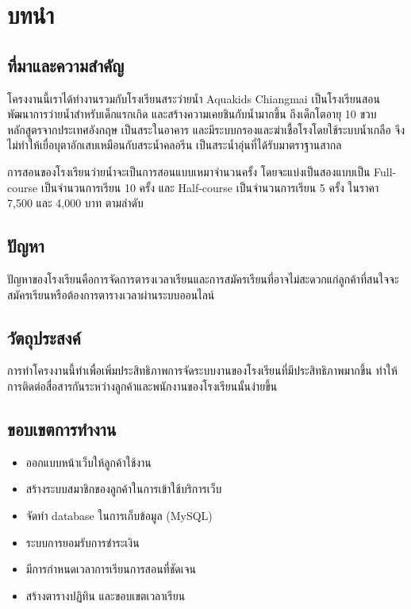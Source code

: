 \section{บทนำ}

\subsection{ที่มาและความสำคัญ}

โครงงานนี้เราได้ทำงานรวมกับโรงเรียนสระว่ายน้ำ Aquakids Chiangmai เป็นโรงเรียนสอนพัฒนาการว่ายน้ำสำหรับเด็กแรกเกิด และสร้างความเคยชินกับน้ำมากขึ้น ถึงเด็กโตอายุ 10 ขวบ หลักสูตรจากประเทศอังกฤษ เป็นสระในอาคาร และมีระบบกรองและฆ่าเชื้อโรงโดยใช้ระบบน้ำเกลือ จึงไม่ทำให้เยื่อบุตาอักเสบเหมือนกับสระน้ำคลอรีน เป็นสระน้ำอุ่นที่ได้รับมาตราฐานสากล

การสอนของโรงเรียนว่ายน้ำจะเป็นการสอนแบบเหมาจำนวนครั้ง โดยจะแบ่งเป็นสองแบบเป็น Full-course เป็นจำนวนการเรียน 10 ครั้ง และ Half-course เป็นจำนวนการเรียน 5 ครั้ง ในราคา 7,500 และ 4,000 บาท ตามลำดับ

\subsection{ปัญหา}

ปัญหาของโรงเรียนคือการจัดการตารงเวลาเรียนและการสมัครเรียนที่อาจไม่สะดวกแก่ลูกค้าที่สนใจจะสมัครเรียนหรือต้องการตารางเวลาผ่านระบบออนไลน์

\subsection{วัตถุประสงค์}

การทำโครงงานนี้ทำเพื่อเพิ่มประสิทธิภาพการจัดระบบงานของโรงเรียนที่มีประสิทธิภาพมากขึ้น ทำให้การติดต่อสื่อสารกันระหว่างลูกค้าและพนักงานของโรงเรียนนั้นง่ายขึ้น

\subsection{ขอบเขตการทำงาน}

\begin{itemize}
    \item ออกแบบหน้าเว็บให้ลูกค้าใช้งาน
    \item สร้างระบบสมาชิกของลูกค้าในการเข้าใช้บริการเว็บ
    \item จัดทำ database ในการเก็บข้อมูล (MySQL)
    \item ระบบการยอมรับการชำระเงิน
    \item มีการกำหนดเวลาการเรียนการสอนที่ชัดเจน
    \item สร้างตารางปฏิทิน และขอบเขตเวลาเรียน
\end{itemize}

